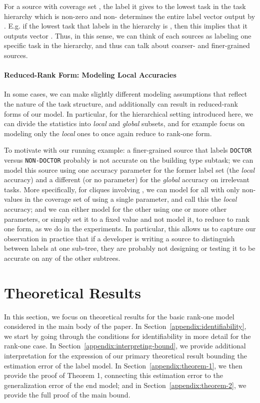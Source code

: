\documentclass[letterpaper]{article}
\begin{document}
\begin{appendix}
For a source  with coverage set , the label it gives to the lowest task in the task hierarchy which is non-zero and non- determines the entire label vector output by .
E.g. if the lowest task that  labels in the hierarchy is , then this implies that it outputs vector .
Thus, in this sense, we can think of each sources  as labeling one specific task in the hierarchy, and thus can talk about coarser- and finer-grained sources.
\paragraph*{Reduced-Rank Form: Modeling Local Accuracies}
In some cases, we can make slightly different modeling assumptions that reflect the nature of the task structure, and additionally can result in reduced-rank forms of our model.
In particular, for the hierarchical setting introduced here, we can divide the statistics  into \textit{local} and \textit{global} subsets, and for example focus on modeling only the \textit{local} ones to once again reduce to rank-one form.

To motivate with our running example: a finer-grained source that labels \texttt{DOCTOR} versus \texttt{NON-DOCTOR} probably is not accurate on the building type subtask; we can model this source using one accuracy parameter for the former label set (the \textit{local} accuracy) and a different (or no parameter) for the \textit{global} accuracy on irrelevant tasks.
More specifically, for cliques involving , we can model  for all  with only non- values in the coverage set of  using a single parameter, and call this the \textit{local} accuracy; and we can either model  for the other  using one or more other parameters, or simply set it to a fixed value and not model it, to reduce to rank one form, as we do in the experiments.
In particular, this allows us to capture our observation in practice that if a developer is writing a source to distinguish between labels at one sub-tree, they are probably not designing or testing it to be accurate on any of the other subtrees. 
\section{Theoretical Results}
  \label{appendix:theoretical}
  \allowdisplaybreaks

In this section, we focus on theoretical results for the basic rank-one model considered in the main body of the paper.
In Section~\ref{appendix:identifiability}, we start by going through the conditions for identifiability in more detail for the rank-one case.
In Section~\ref{appendix:interpreting-bound}, we provide additional interpretation for the expression of our primary theoretical result bounding the estimation error of the label model.
In Section~\ref{appendix:theorem-1}, we then provide the proof of Theorem 1, connecting this estimation error to the generalization error of the end model; and in Section~\ref{appendix:theorem-2}, we provide the full proof of the main bound.



\end{appendix}
\end{document}
